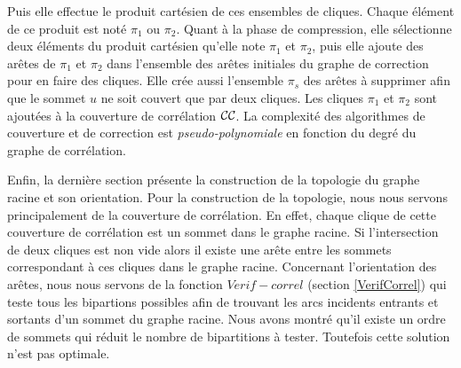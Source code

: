 Puis elle effectue le produit cart\'esien de ces ensembles de cliques. Chaque \'el\'ement de ce produit est not\'e $\pi_1$ ou $\pi_2$.
Quant \`a la phase de compression, elle s\'electionne deux \'el\'ements du produit cart\'esien qu'elle note  $\pi_1$ et $\pi_2$, puis elle ajoute des ar\^etes de  $\pi_1$ et $\pi_2$ dans l'ensemble des ar\^etes initiales du graphe de correction pour en faire des cliques. Elle cr\'ee aussi l'ensemble $\pi_s$ des ar\^etes \`a supprimer afin que le sommet $u$ ne soit couvert que par deux cliques. 
Les cliques $\pi_1$ et $\pi_2$ sont ajout\'ees \`a la couverture de corr\'elation $\cal CC$. 
La complexit\'e des algorithmes de couverture et de correction est {\em pseudo-polynomiale} en fonction du degr\'e du graphe de corr\'elation. 
\newline 

Enfin, la derni\`ere section pr\'esente la construction de la topologie du graphe racine et son orientation. Pour la construction de la topologie, nous nous servons principalement de la couverture de corr\'elation. En effet, chaque clique de cette couverture de corr\'elation est un sommet dans le graphe racine. Si l'intersection de deux cliques est non vide alors il existe une ar\^ete entre les sommets correspondant \`a ces cliques dans le graphe racine. 
Concernant l'orientation des ar\^etes, nous nous servons de la fonction $Verif-correl$ (section \ref{VerifCorrel}) qui teste tous les bipartions possibles afin de trouvant les arcs incidents entrants et sortants d'un sommet du graphe racine. Nous avons montr\'e qu'il existe un ordre de sommets qui r\'eduit le nombre de bipartitions \`a tester. Toutefois cette solution n'est pas optimale. 
